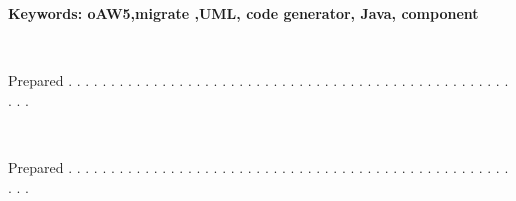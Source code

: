 \documentclass[letterpaper,11pt]{article}
\newcommand\PreparedA{Alexis Tejeda}
\newcommand\PreparedG{Gabriel Zamora}
\newcommand\PDate{YYYY-MM-DD}
\newcommand\Keywords{oAW5,migrate ,UML, code generator, Java, component}
\begin{document}
\begin{center}
\vspace{2.5cm}

%
%
%

\vspace{-1.5cm}
\begin{center}
\normalsize
{\bf Keywords: \Keywords}
\end{center}
\vspace{0.5cm}

{\small {\tt \hspace{-0.8cm}{\PreparedA} \hspace{2.2cm}{\PDate }}}  %
\vspace{-0.3cm}

\large
\hspace{-0.7cm} {Prepared  \small . . . . . . . . . . . . . . . . . . . . . . . . . . . . . . . . . . . . . . . . . . . . . . . . . . . . . . .}

\footnotesize
\hspace{2.5cm}{Name} \hspace{4cm}{Date}  \hspace{2cm}{Signature}
\vspace{1cm}

{\small {\tt \hspace{-0.8cm}{\PreparedG} \hspace{2.2cm}{\PDate }}}  %
\vspace{-0.3cm}

\large
\hspace{-0.7cm} {Prepared  \small . . . . . . . . . . . . . . . . . . . . . . . . . . . . . . . . . . . . . . . . . . . . . . . . . . . . . . .}


\end{center}
\end{document}
